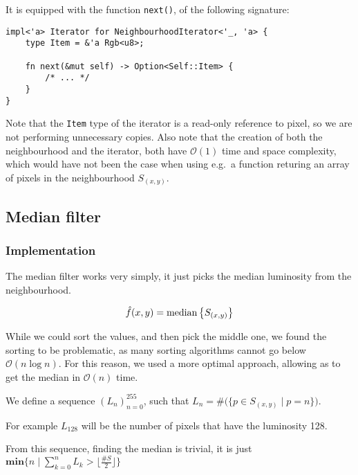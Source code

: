 \documentclass[12pt]{article}
\begin{document}
It is equipped with the function \lstinline{next()}, of the following signature:

\begin{lstlisting}
impl<'a> Iterator for NeighbourhoodIterator<'_, 'a> {
    type Item = &'a Rgb<u8>;

    fn next(&mut self) -> Option<Self::Item> {
        /* ... */
    }
}
\end{lstlisting}

Note that the \lstinline{Item} type of the iterator is a read-only reference to pixel, so we are not performing unnecessary copies.
Also note that the creation of both the neighbourhood and the iterator, both have $\mathcal{O}(1)$ time and space complexity,
which would have not been the case when using e.g.\ a function returing an array of pixels in the neighbourhood $S_{(x,y)}$.

\subsection{Median filter}

\subsubsection{Implementation}\label{sec:median-impl}

The median filter works very simply, it just picks the median luminosity from the neighbourhood.

\begin{equation}
    \hat{f}(x,y) = \operatorname*{median} \big\{ S_{(x,y)} \big\}
\end{equation}

While we could sort the values, and then pick the middle one,
we found the sorting to be problematic, as many sorting algorithms cannot go below $\mathcal{O}(n \log n)$.
For this reason, we used a more optimal approach, allowing as to get the median in $\mathcal{O}(n)$ time.

We define a sequence $(L_n)_{n=0}^{255}$, such that $L_n = \#\big(\{p \in S_{(x,y)} \mid p = n\}\big)$.

For example $L_{128}$ will be the number of pixels that have the luminosity 128.

From this sequence, finding the median is trivial, it is just $\mathbf{min}\big\{n \mid \sum_{k=0}^n L_k > \lfloor \frac{\#S}{2} \rfloor \big\}$
\end{document}
